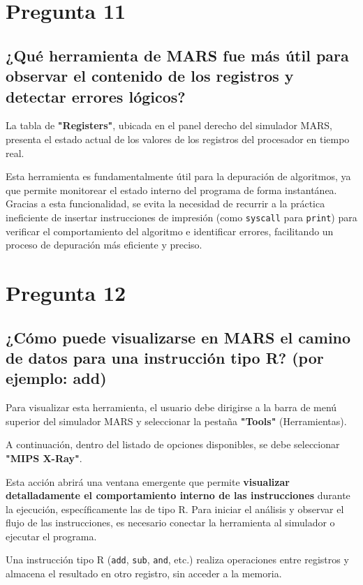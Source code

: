\documentclass{article}
\begin{document}
\section*{Pregunta 11}
\subsection*{¿Qué herramienta de MARS fue más útil para observar el contenido de los registros y detectar errores lógicos?}
La tabla de \textbf{"Registers"}, ubicada en el panel derecho del simulador MARS, presenta el estado actual de los valores de los registros del procesador en tiempo real.

Esta herramienta es fundamentalmente útil para la depuración de algoritmos, ya que permite monitorear el estado interno del programa de forma instantánea. Gracias a esta funcionalidad, se evita la necesidad de recurrir a la práctica ineficiente de insertar instrucciones de impresión (como \texttt{syscall} para \texttt{print}) para verificar el comportamiento del algoritmo e identificar errores, facilitando un proceso de depuración más eficiente y preciso.

\section*{Pregunta 12}
\subsection*{¿Cómo puede visualizarse en MARS el camino de datos para una instrucción tipo R? (por ejemplo: add)}
Para visualizar esta herramienta, el usuario debe dirigirse a la barra de menú superior del simulador MARS y seleccionar la pestaña \textbf{"Tools"} (Herramientas).

A continuación, dentro del listado de opciones disponibles, se debe seleccionar \textbf{"MIPS X-Ray"}.

Esta acción abrirá una ventana emergente que permite \textbf{visualizar detalladamente el comportamiento interno de las instrucciones} durante la ejecución, específicamente las de tipo R. Para iniciar el análisis y observar el flujo de las instrucciones, es necesario conectar la herramienta al simulador o ejecutar el programa.

Una instrucción tipo R (\texttt{add}, \texttt{sub}, \texttt{and}, etc.) realiza operaciones entre registros y almacena el resultado en otro registro, sin acceder a la memoria.
\end{document}
